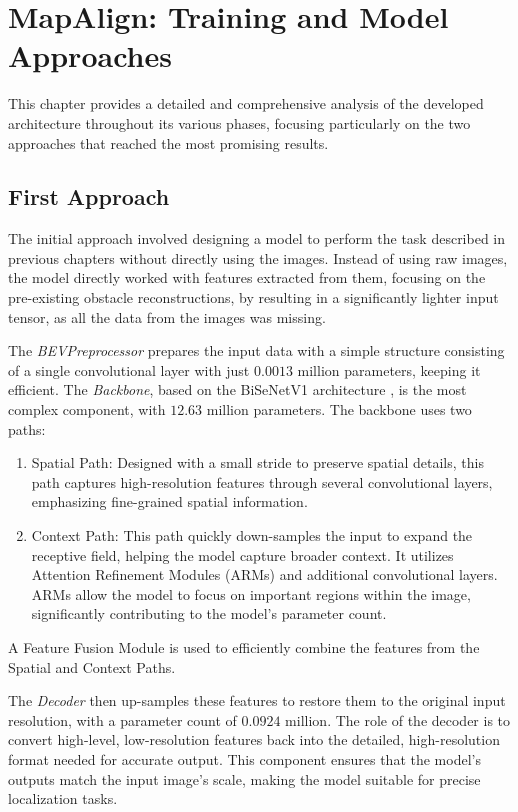 \NoBgThispage
\chapter{MapAlign: Training and Model Approaches}

This chapter provides a detailed and comprehensive analysis of the developed architecture throughout its various phases, focusing particularly on the two approaches that reached the most promising results.

\section{First Approach}

The initial approach involved designing a model to perform the task described in previous chapters without directly using the images. Instead of using raw images, the model directly worked with features extracted from them, focusing on the pre-existing obstacle reconstructions, by resulting in a significantly lighter input tensor, as all the data from the images was missing.

The \textit{BEVPreprocessor} prepares the input data with a simple structure consisting of a single convolutional layer with just $0.0013$ million parameters, keeping it efficient. 
The \textit{Backbone}, based on the BiSeNetV1 architecture \cite{DBLP:journals/corr/abs-1808-00897}, is the most complex component, with $12.63$ million parameters. The backbone uses two paths: 
\begin{enumerate}
    \item Spatial Path: Designed with a small stride to preserve spatial details, this path captures high-resolution features through several convolutional layers, emphasizing fine-grained spatial information.
    \item Context Path: This path quickly down-samples the input to expand the receptive field, helping the model capture broader context. It utilizes Attention Refinement Modules (ARMs) and additional convolutional layers. ARMs allow the model to focus on important regions within the image, significantly contributing to the model's parameter count.
\end{enumerate}
A Feature Fusion Module is used to efficiently combine the features from the Spatial and Context Paths.

The \textit{Decoder} then up-samples these features to restore them to the original input resolution, with a parameter count of $0.0924$ million. The role of the decoder is to convert high-level, low-resolution features back into the detailed, high-resolution format needed for accurate output. This component ensures that the model’s outputs match the input image's scale, making the model suitable for precise localization tasks.

